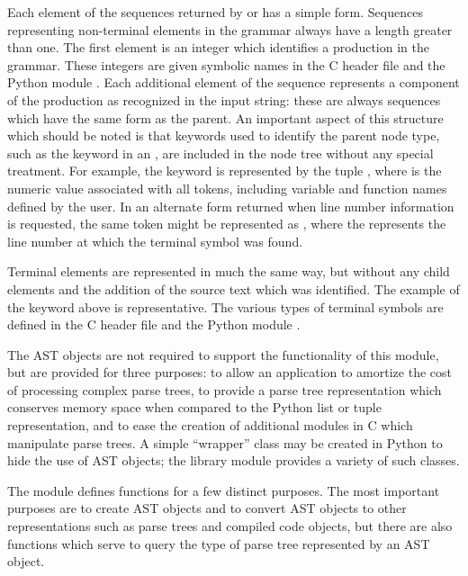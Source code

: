 Each element of the sequences returned by  or
 has a simple form.  Sequences representing
non-terminal elements in the grammar always have a length greater than
one.  The first element is an integer which identifies a production in
the grammar.  These integers are given symbolic names in the C header
file  and the Python module
.  Each additional element of the sequence represents
a component of the production as recognized in the input string: these
are always sequences which have the same form as the parent.  An
important aspect of this structure which should be noted is that
keywords used to identify the parent node type, such as the keyword
 in an , are included in the node tree without
any special treatment.  For example, the  keyword is
represented by the tuple , where  is the
numeric value associated with all  tokens, including
variable and function names defined by the user.  In an alternate form
returned when line number information is requested, the same token
might be represented as , where the 
represents the line number at which the terminal symbol was found.

Terminal elements are represented in much the same way, but without
any child elements and the addition of the source text which was
identified.  The example of the  keyword above is
representative.  The various types of terminal symbols are defined in
the C header file  and the Python module
.

The AST objects are not required to support the functionality of this
module, but are provided for three purposes: to allow an application
to amortize the cost of processing complex parse trees, to provide a
parse tree representation which conserves memory space when compared
to the Python list or tuple representation, and to ease the creation
of additional modules in C which manipulate parse trees.  A simple
``wrapper'' class may be created in Python to hide the use of AST
objects; the  library module provides a variety of such
classes.

The  module defines functions for a few distinct
purposes.  The most important purposes are to create AST objects and
to convert AST objects to other representations such as parse trees
and compiled code objects, but there are also functions which serve to
query the type of parse tree represented by an AST object.

